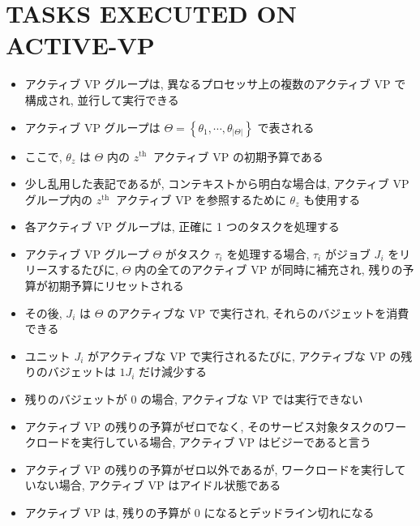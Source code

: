 
\section{TASKS EXECUTED ON ACTIVE-VP}
\label{sec: tasks executed on active-vp}

\begin{frame}{}
    \begin{itemize}
        \item アクティブ VP グループは, 異なるプロセッサ上の複数のアクティブ VP で構成され, 並行して実行できる
        \item アクティブ VP グループは $\Theta=\left\{\theta_{1}, \cdots, \theta_{|\Theta|}\right\}$ で表される
        \item ここで, $\theta_{z}$ は $\Theta$ 内の $z^{\text {th }}$ アクティブ VP の初期予算である
        \item 少し乱用した表記であるが, コンテキストから明白な場合は, アクティブ VP グループ内の $z^{\text {th }}$ アクティブ VP を参照するために $\theta_{z}$ も使用する
    \end{itemize}
\end{frame}

\begin{frame}{}
    \begin{itemize}
        \item 各アクティブ VP グループは, 正確に 1 つのタスクを処理する
        \item アクティブ VP グループ $\Theta$ がタスク $\tau_{i}$ を処理する場合, $\tau_{i}$ がジョブ $J_{i}$ をリリースするたびに, $\Theta$ 内の全てのアクティブ VP が同時に補充され, 残りの予算が初期予算にリセットされる
        \item その後, $J_{i}$ は $\Theta$ のアクティブな VP で実行され, それらのバジェットを消費できる
        \item ユニット $J_{i}$ がアクティブな $\mathrm{VP}$ で実行されるたびに, アクティブな VP の残りのバジェットは $1J_{i}$ だけ減少する
        \item 残りのバジェットが 0 の場合, アクティブな VP では実行できない
        \item アクティブ VP の残りの予算がゼロでなく, そのサービス対象タスクのワークロードを実行している場合, アクティブ VP はビジーであると言う
        \item アクティブ VP の残りの予算がゼロ以外であるが, ワークロードを実行していない場合, アクティブ VP はアイドル状態である
        \item アクティブ VP は, 残りの予算が 0 になるとデッドライン切れになる
    \end{itemize}
\end{frame}

